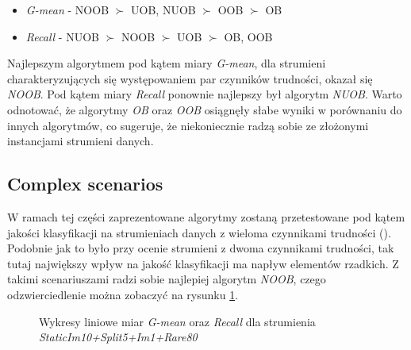 \begin{itemize}
    \item \textit{G-mean} - NOOB $\succ$ UOB, NUOB $\succ$ OOB $\succ$ OB
    \item \textit{Recall} - NUOB $\succ$ NOOB $\succ$ UOB $\succ$ OB, OOB
\end{itemize}

\noindent Najlepszym algorytmem pod kątem miary \textit{G-mean}, dla strumieni charakteryzujących się występowaniem par czynników trudności, okazał się \textit{NOOB}. Pod kątem miary \textit{Recall} ponownie najlepszy był algorytm \textit{NUOB}. Warto odnotować, że algorytmy \textit{OB} oraz \textit{OOB} osiągnęły słabe wyniki w porównaniu do innych algorytmów, co sugeruje, że niekoniecznie radzą sobie ze złożonymi instancjami strumieni danych.

\subsection{Complex scenarios}

\noindent W ramach tej części zaprezentowane algorytmy zostaną przetestowane pod kątem jakości klasyfikacji na strumieniach danych z wieloma czynnikami trudności (). Podobnie jak to było przy ocenie strumieni z dwoma czynnikami trudności, tak tutaj największy wpływ na jakość klasyfikacji ma napływ elementów rzadkich. Z takimi scenariuszami radzi sobie najlepiej algorytm \textit{NOOB}, czego odzwierciedlenie można zobaczyć na rysunku \ref{Figure:ComlexScenario}.

\newpage

\begin{figure}[h]
    \centering
    \qquad
    \caption{Wykresy liniowe miar \textit{G-mean} oraz \textit{Recall} dla strumienia \textit{StaticIm10+Split5+Im1+Rare80}}\label{Figure:ComlexScenario}
\end{figure}

